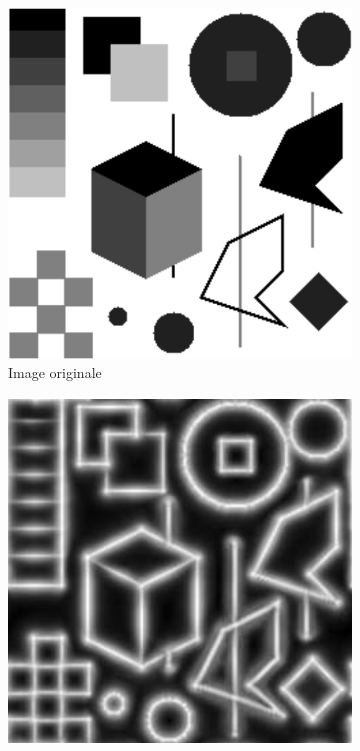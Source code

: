 \begin{figure}
    \centering
    \begin{subfigure}{.3\textwidth}
        \centering
        \includegraphics[width=\textwidth]{contenu/resources/images/geometry_shapes}
        \caption{Image originale}
    \end{subfigure}
    \hfill
    \begin{subfigure}{.3\textwidth}
        \centering
        \includegraphics[width=\textwidth]{contenu/resources/images/geometric_shapes_pc_kovesi}

\end{subfigure}
\end{figure}

